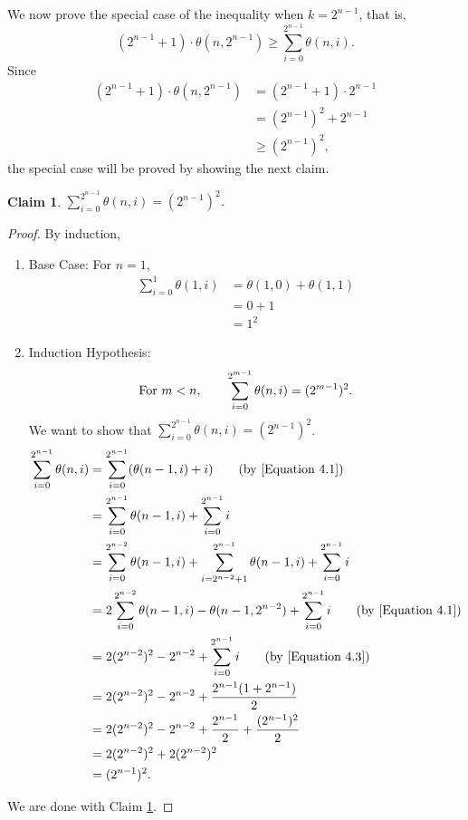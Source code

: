 \documentclass[12pt]{ucthesis}
\theoremstyle{plain}
\newtheorem{claim}{Claim}
\theoremstyle{definition}
\begin{document}
We now prove the special case of the inequality when $k = 2^{n - 1}$, that is,
\begin{equation*}
(2^{n - 1} + 1) \cdot \theta(n, 2^{n - 1}) \ge \sum_{i = 0}^{2^{n - 1}} \theta(n, i).
\end{equation*}
Since
\begin{align*}
(2^{n - 1} + 1) \cdot \theta(n, 2^{n - 1})
& = (2^{n - 1} + 1) \cdot 2^{n - 1} \\
& = (2^{n - 1})^2 + 2^{n - 1} \\
& \ge (2^{n - 1})^2,
\end{align*}
the special case will be proved by showing the next claim.

\begin{claim}
\label{Claim 4}
$\sum_{i = 0}^{2^{n - 1}} \theta(n, i) = (2^{n - 1})^2$.
\end{claim}
\begin{proof}
By induction,
\begin{enumerate}[(1)]
\item Base Case: For $n = 1$,
	\begin{align*}
	\sum_{i = 0}^1 \theta(1, i)
	& = \theta(1, 0) + \theta(1, 1) \\
	& = 0 + 1 \\
	& = 1^2
	\end{align*}
\item Induction Hypothesis:
	\begin{equation}
	\label{Equation 4.3}
	\textnormal{For } m < n, \qquad
	\sum_{i = 0}^{2^{m - 1}} \theta(n, i) = (2^{m - 1})^2.
	\end{equation}
	We want to show that $\sum_{i = 0}^{2^{n - 1}} \theta(n, i) = (2^{n - 1})^2$.
	\begin{align*}
	\sum_{i = 0}^{2^{n - 1}} \theta(n, i)
	& = \sum_{i = 0}^{2^{n - 1}} (\theta(n - 1, i) + i) \tag{by \ref{Equation 4.1}} \\
	& = \sum_{i = 0}^{2^{n - 1}} \theta(n - 1, i) + \sum_{i = 0}^{2^{n - 1}} i \\
	& = \sum_{i = 0}^{2^{n - 2}} \theta(n - 1, i) +
	    \sum_{i = 2^{n - 2} + 1}^{2^{n - 1}} \theta(n - 1, i) + \sum_{i = 0}^{2^{n - 1}} i \\
	& = 2 \sum_{i = 0}^{2^{n - 2}} \theta(n - 1, i) - \theta(n - 1, 2^{n - 2}) +
	    \sum_{i = 0}^{2^{n - 1}} i \tag{by \ref{Equation 4.1}} \\
	& = 2 (2^{n - 2})^2 - 2^{n - 2} + \sum_{i = 0}^{2^{n - 1}} i \tag{by \ref{Equation 4.3}} \\
	& = 2 (2^{n - 2})^2 - 2^{n - 2} + \frac{2^{n - 1}(1 + 2^{n - 1})}{2} \\
	& = 2 (2^{n - 2})^2 - 2^{n - 2} + \frac{2^{n - 1}}{2} + \frac{(2^{n - 1})^2}{2} \\
	& = 2 (2^{n - 2})^2 + 2 (2^{n - 2})^2 \\
	& = (2^{n - 1})^2.
	\end{align*}
\end{enumerate}
We are done with Claim \ref{Claim 4}.
\end{proof}
\end{document}
